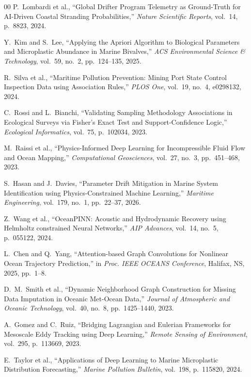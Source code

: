 \documentclass[conference]{IEEEtran}
\begin{document}
\begin{thebibliography}{00}
P.~Lombardi et al., ``Global Drifter Program Telemetry as Ground-Truth for AI-Driven Coastal Stranding Probabilities,'' \textit{Nature Scientific Reports}, vol.~14, p.~8823, 2024.

Y.~Kim and S.~Lee, ``Applying the Apriori Algorithm to Biological Parameters and Microplastic Abundance in Marine Bivalves,'' \textit{ACS Environmental Science \& Technology}, vol.~59, no.~2, pp.~124--135, 2025.

R.~Silva et al., ``Maritime Pollution Prevention: Mining Port State Control Inspection Data using Association Rules,'' \textit{PLOS One}, vol.~19, no.~4, e0298132, 2024.

C.~Rossi and L.~Bianchi, ``Validating Sampling Methodology Associations in Ecological Surveys via Fisher's Exact Test and Support-Confidence Logic,'' \textit{Ecological Informatics}, vol.~75, p.~102034, 2023.


M.~Raissi et al., ``Physics-Informed Deep Learning for Incompressible Fluid Flow and Ocean Mapping,'' \textit{Computational Geosciences}, vol.~27, no.~3, pp.~451--468, 2023.

S.~Hasan and J.~Davies, ``Parameter Drift Mitigation in Marine System Identification using Physics-Constrained Machine Learning,'' \textit{Maritime Engineering}, vol.~179, no.~1, pp.~22--37, 2026.

Z.~Wang et al., ``OceanPINN: Acoustic and Hydrodynamic Recovery using Helmholtz constrained Neural Networks,'' \textit{AIP Advances}, vol.~14, no.~5, p.~055122, 2024.

L.~Chen and Q.~Yang, ``Attention-based Graph Convolutions for Nonlinear Ocean Trajectory Prediction,'' in \textit{Proc. IEEE OCEANS Conference}, Halifax, NS, 2025, pp.~1--8.

D.~M.~Smith et al., ``Dynamic Neighborhood Graph Construction for Missing Data Imputation in Oceanic Met-Ocean Data,'' \textit{Journal of Atmospheric and Oceanic Technology}, vol.~40, no.~8, pp.~1425--1440, 2023.

A.~Gomez and C.~Ruiz, ``Bridging Lagrangian and Eulerian Frameworks for Mesoscale Eddy Tracking using Deep Learning,'' \textit{Remote Sensing of Environment}, vol.~295, p.~113669, 2023.

E.~Taylor et al., ``Applications of Deep Learning to Marine Microplastic Distribution Forecasting,'' \textit{Marine Pollution Bulletin}, vol.~198, p.~115820, 2024.


\end{thebibliography}
\end{document}
